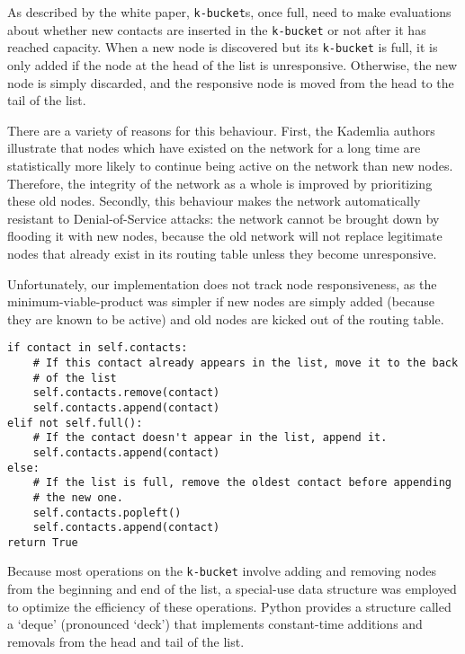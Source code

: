 \documentclass[12pt]{report}
\newcommand{\code}[1]{\colorbox{codegray}{\texttt{#1}}}
\begin{document}
                As described by the white
                paper, \code{k-bucket}s, once full, need to make evaluations
                about whether new contacts are inserted in the \code{k-bucket}
                or not after it has reached capacity.  When a new node is
                discovered but its \code{k-bucket} is full, it is only added if
                the node at the head of the list is unresponsive.  Otherwise,
                the new node is simply discarded, and the responsive node is
                moved from the head to the tail of the list.

                There are a variety of reasons for this behaviour.  First, the
                Kademlia authors illustrate that nodes which have existed on
                the network for a long time are statistically more likely to
                continue being active on the network than new nodes.
                Therefore, the integrity of the network as a whole is improved
                by prioritizing these old nodes.  Secondly, this behaviour
                makes the network automatically resistant to Denial-of-Service
                attacks: the network cannot be brought down by flooding it with
                new nodes, because the old network will not replace legitimate
                nodes that already exist in its routing table unless they
                become unresponsive.

                Unfortunately, our implementation does not track node
                responsiveness, as the minimum-viable-product was simpler if
                new nodes are simply added (because they are known to be
                active) and old nodes are kicked out of the routing table.

\begin{lstlisting}[label=KBucket.add]
if contact in self.contacts:
    # If this contact already appears in the list, move it to the back
    # of the list
    self.contacts.remove(contact)
    self.contacts.append(contact)
elif not self.full():
    # If the contact doesn't appear in the list, append it.
    self.contacts.append(contact)
else:
    # If the list is full, remove the oldest contact before appending
    # the new one.
    self.contacts.popleft()
    self.contacts.append(contact)
return True
\end{lstlisting}
            Because most operations on the \code{k-bucket} involve adding and
            removing nodes from the beginning and end of the list, a
            special-use data structure was employed to optimize the efficiency
            of these operations.  Python provides a structure called a `deque'
            (pronounced `deck') that implements constant-time additions and
            removals from the head and tail of the list.
\end{document}
